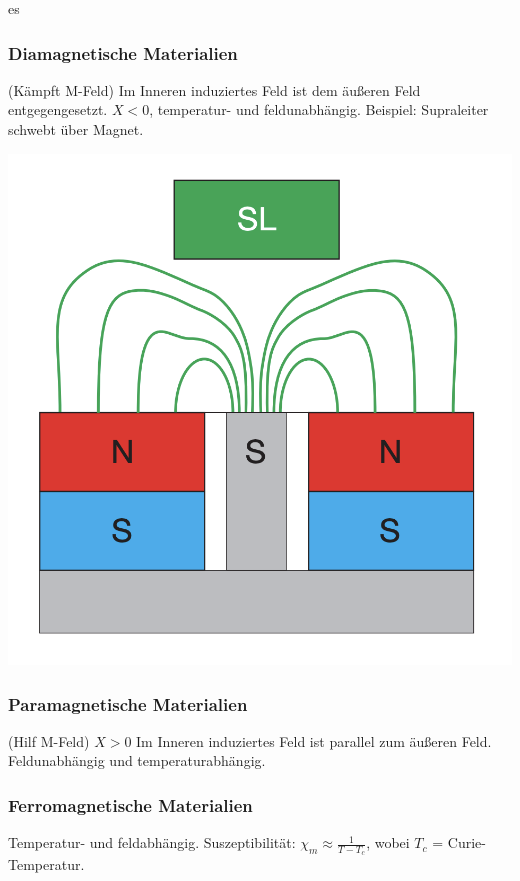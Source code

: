 es\documentclass[a4paper, fontsize=8pt, landscape]{scrartcl}
\begin{document}
\begin{multicols*}{4}
    \subsubsection{Diamagnetische Materialien}
        (Kämpft M-Feld)
        Im Inneren induziertes Feld ist dem äußeren Feld entgegengesetzt. $X < 0$, temperatur- und feldunabhängig. Beispiel: Supraleiter schwebt über Magnet.
        \begin{center}
            \includegraphics[scale=0.2]{Images/Suprameter.png}
        \end{center}
    \subsubsection{Paramagnetische Materialien}
        (Hilf M-Feld)
        $X > 0$
        Im Inneren induziertes Feld ist parallel zum äußeren Feld. Feldunabhängig und temperaturabhängig.
    \subsubsection{Ferromagnetische Materialien}
        Temperatur- und feldabhängig. Suszeptibilität: $\chi_m \approx \frac{1}{T - T_c}$, wobei $T_c$ = Curie-Temperatur.

\columnbreak

\end{multicols*}
\end{document}
